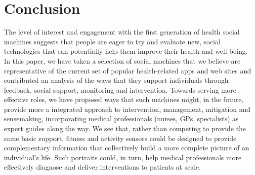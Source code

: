 \documentclass{www13-companion-accepted}
\begin{document}

\section{Conclusion}

The level of interest and engagement with the first generation of
health social machines suggests that people are eager to try and
evaluate new, social technologies that can potentially help them
improve their health and well-being. In this paper, we have taken a
selection of social machines that we believe are representative of the
current set of popular health-related apps and web sites and
contributed an analysis of the ways that they support individuals
through feedback, social support, monitoring and intervention. Towards
serving more effective roles, we have proposed ways that such machines
might, in the future, provide more a integrated approach to
intervention, management, mitigation and sensemaking, incorporating
medical professionals (nurses, GPs, specialists) as expert guides
along the way.  We see that, rather than competing to provide the same
basic support, fitness and activity sensors could be designed to
provide complementary information that collectively build a more
complete picture of an individual's life.  Such portraits could, in
turn, help medical professionals more effectively diagnose and deliver
interventions to patients at scale.


\end{document}
